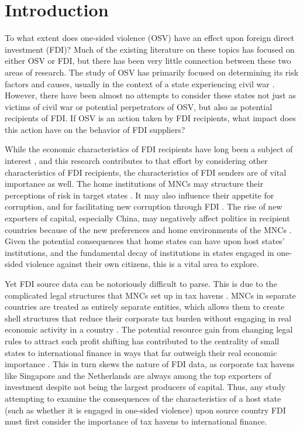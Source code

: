 \documentclass[11pt, titlepage]{article} %
\begin{document}
\section*{Introduction}

To what extent does one-sided violence (OSV) have an effect upon foreign direct investment (FDI)? Much of the existing literature on these topics has focused on either OSV or FDI, but there has been very little connection between these two areas of research. The study of OSV has primarily focused on determining its risk factors and causes, usually in the context of a state experiencing civil war \parencite{kalyvas2006logic,Weinstein07}. However, there have been almost no attempts to consider these states not just as victims of civil war or potential perpetrators of OSV, but also as potential recipients of FDI. If OSV is an action taken by FDI recipients, what impact does this action have on the behavior of FDI suppliers?

While the economic characteristics of FDI recipients have long been a subject of interest \parencite{jensen2006}, and this research contributes to that effort by considering other characteristics of FDI recipients, the characteristics of FDI senders are of vital importance as well. The home institutions of MNCs may structure their perceptions of risk in target states \parencite{beazerConditionalNaturePolitical2018}. It may also influence their appetite for corruption, and for facilitating new corruption through FDI \parencite{brazysSunshineCurseForeign2020}. The rise of new exporters of capital, especially China, may negatively affect politics in recipient countries because of the new preferences and home environments of the MNCs \parencite{yangRacingBottomChinese2023}. Given the potential consequences that home states can have upon host states' institutions, and the fundamental decay of institutions in states engaged in one-sided violence against their own citizens, this is a vital area to explore. 

Yet FDI source data can be notoriously difficult to parse. This is due to the complicated legal structures that MNCs set up in tax havens \parencite{findleyGlobalShellGames2012}. MNCs in separate countries are treated as entirely separate entities, which allows them to create shell structures that reduce their corporate tax burden without engaging in real economic activity in a country \parencite{keenCorporateTaxationGlobal2019}. The potential resource gain from changing legal rules to attract such profit shifting has contributed to the centrality of small states to international finance in ways that far outweigh their real economic importance \parencite{garcia-bernardoUncoveringOffshoreFinancial2017}. This in turn skews the nature of FDI data, as corporate tax havens like Singapore and the Netherlands are always among the top exporters of investment despite not being the largest producers of capital. Thus, any study attempting to examine the consequences of the characteristics of a host state (such as whether it is engaged in one-sided violence) upon source country FDI must first consider the importance of tax havens to international finance. 
\end{document}

